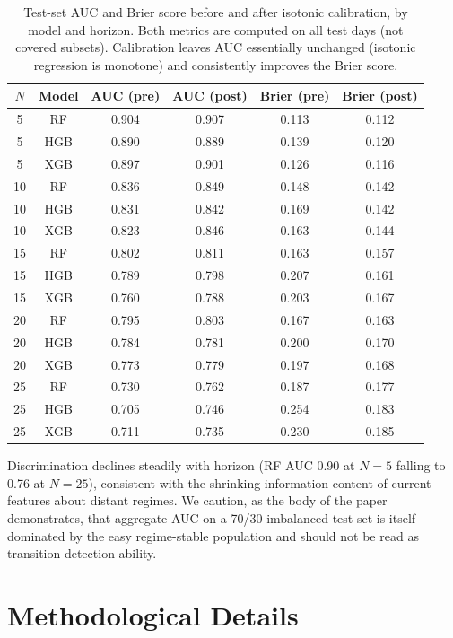 \documentclass[12pt]{article}
\begin{document}
\begin{table}[H]
\centering
\caption{Test-set AUC and Brier score before and after isotonic calibration, by model and
horizon. Both metrics are computed on all test days (not covered subsets). Calibration leaves
AUC essentially unchanged (isotonic regression is monotone) and consistently improves the
Brier score.}
\label{tab:aucbrier}
\begin{tabular}{cccccc}
\toprule
$N$ & Model & AUC (pre) & AUC (post) & Brier (pre) & Brier (post) \\
\midrule
5  & RF  & 0.904 & 0.907 & 0.113 & 0.112 \\
5  & HGB & 0.890 & 0.889 & 0.139 & 0.120 \\
5  & XGB & 0.897 & 0.901 & 0.126 & 0.116 \\
10 & RF  & 0.836 & 0.849 & 0.148 & 0.142 \\
10 & HGB & 0.831 & 0.842 & 0.169 & 0.142 \\
10 & XGB & 0.823 & 0.846 & 0.163 & 0.144 \\
15 & RF  & 0.802 & 0.811 & 0.163 & 0.157 \\
15 & HGB & 0.789 & 0.798 & 0.207 & 0.161 \\
15 & XGB & 0.760 & 0.788 & 0.203 & 0.167 \\
20 & RF  & 0.795 & 0.803 & 0.167 & 0.163 \\
20 & HGB & 0.784 & 0.781 & 0.200 & 0.170 \\
20 & XGB & 0.773 & 0.779 & 0.197 & 0.168 \\
25 & RF  & 0.730 & 0.762 & 0.187 & 0.177 \\
25 & HGB & 0.705 & 0.746 & 0.254 & 0.183 \\
25 & XGB & 0.711 & 0.735 & 0.230 & 0.185 \\
\bottomrule
\end{tabular}
\end{table}

Discrimination declines steadily with horizon (RF AUC 0.90 at $N = 5$ falling to 0.76 at
$N = 25$), consistent with the shrinking information content of current features about distant
regimes. We caution, as the body of the paper demonstrates, that aggregate AUC on a
70/30-imbalanced test set is itself dominated by the easy regime-stable population and should
not be read as transition-detection ability.

\section{Methodological Details}
\label{app:methods}
\end{document}
